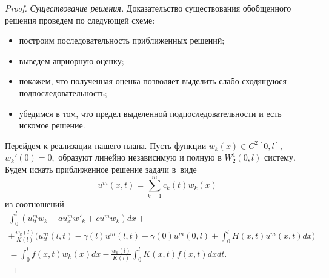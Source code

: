 \begin{proof}
\smallskip

{\it Существование решения.} 
Доказательство существования обобщенного решения
проведем по следующей схеме: 
\begin{itemize}
\item[--] построим последовательность приближенных решений;
\item[--] выведем априорную оценку; 
\item[--] покажем, что полученная оценка позволяет выделить слабо сходящуюся подпоследовательность; 
\item[--] убедимся в том, что предел выделенной подпоследовательности и есть искомое решение.
\end{itemize}

Перейдем к реализации нашего плана.
Пусть функции $w_k(x)\in C^2[0, l],$ $ w_k'(0)=0,$  образуют  линейно независимую и полную  в $W_2^1(0, l)$ систему.
Будем искать приближенное решение задачи  в~виде
\begin{equation}
 \label{ph9}
u^m(x,t)=\sum\limits_{k=1}^mc_k(t)w_k(x)
\end{equation}
из соотношений
\begin{multline}
\int _0^l(u^m_{tt}w_k+au^m_xw'_k+cu^mw_k)dx+
\\
+\frac{w_k(l)}{K(l)}
\biggl( 
u^m_{tt}(l,t)-\gamma(l)u^m(l,t)+ \gamma(0)u^m(0, l)+ \int _0^lH(x,t)u^m(x,t)dx
\biggr)=
\\
 \label{ph10}
= \int _0^lf(x,t)w_k(x)dx-\frac{w_k(l)}{K(l)} \int _0^lK(x,t)f(x,t)dxdt.
\end{multline}


\end{proof}
